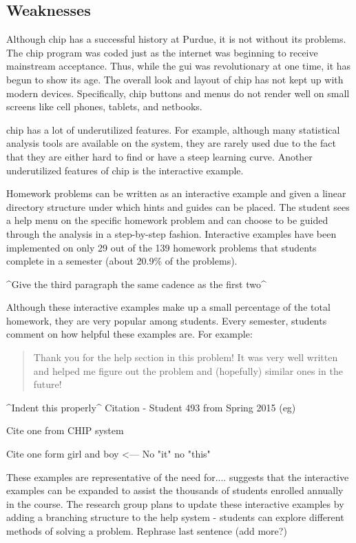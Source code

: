 \subsection*{Weaknesses}

Although \gls{chip} has a successful history at Purdue, it is not without its problems. The \gls{chip} program was coded just as the internet was beginning to receive mainstream acceptance. Thus, while the \gls{gui} was revolutionary at one time, it has begun to show its age. The overall look and layout of \gls{chip} has not kept up with modern devices. Specifically, \gls{chip} buttons and menus do not render well on small screens like cell phones, tablets, and netbooks.

\gls{chip} has a lot of underutilized features. For example, although many statistical analysis tools are available on the system, they are rarely used due to the fact that they are either hard to find or have a steep learning curve. Another underutilized features of \gls{chip} is the interactive example.

Homework problems can be written as an interactive example and given a linear directory structure under which hints and guides can be placed. The student sees a help menu on the specific homework problem and can choose to be guided through the analysis in a step-by-step fashion. Interactive examples have been implemented on only 29 out of the 139 homework problems that students complete in a semester (about 20.9\% of the problems).

^Give the third paragraph the same cadence as the first two^

Although these interactive examples make up a small percentage of the total homework, they are very popular among students. Every semester, students comment on how helpful these examples are. For example:

\begin{quotation}
Thank you for the help section in this problem! It was very well written and helped me figure out the problem and (hopefully) similar ones in the future!
\end{quotation}

^Indent this properly^
Citation - Student 493 from Spring 2015 (eg)

Cite one from CHIP system

Cite one form girl and boy <---
No "it" no "this"

These examples are representative of the need for.... suggests that the interactive examples can be expanded to assist the thousands of students enrolled annually in the course. The research group plans to update these interactive examples by adding a branching structure to the help system - students can explore different methods of solving a problem.
Rephrase last sentence (add more?)

